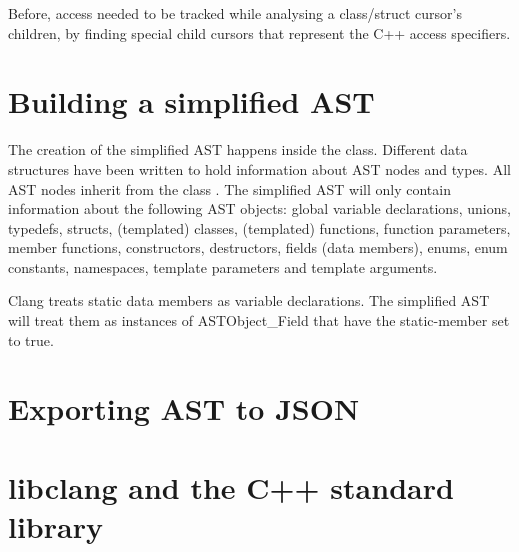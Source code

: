 Before, access needed to be tracked while analysing a class/struct cursor's children, by finding special child cursors that represent the C++ access specifiers.

\section{Building a simplified AST}

The creation of the simplified AST happens inside the  class. Different data structures have been written to hold information about AST nodes and types. All AST nodes inherit from the class . The simplified AST will only contain information about the following AST objects: global variable declarations, unions, typedefs, structs, (templated) classes, (templated) functions, function parameters, member functions, constructors, destructors, fields (data members), enums, enum constants, namespaces, template parameters and template arguments.


Clang treats static data members as variable declarations. The simplified AST will treat them as instances of
 ASTObject\_Field that have the static-member set to true.



\section{Exporting AST to JSON}

\section{libclang and the C++ standard library}
